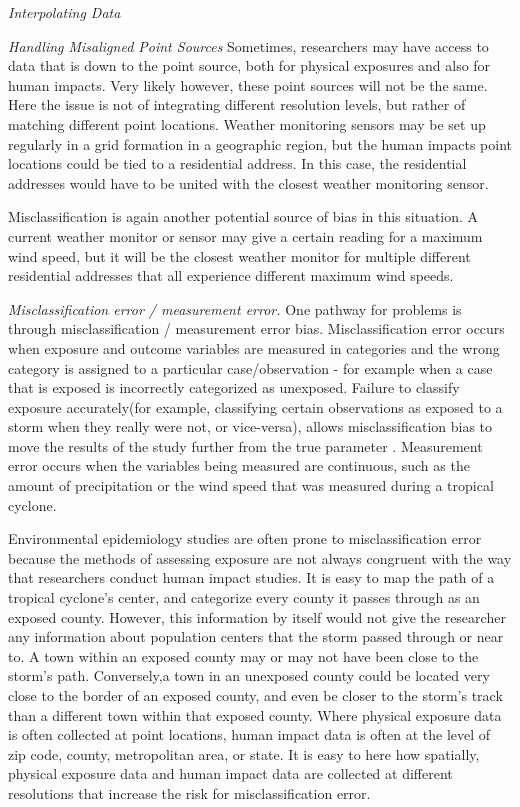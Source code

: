 \documentclass[]{article}
\begin{document}
\emph{Interpolating Data}

\emph{Handling Misaligned Point Sources} Sometimes, researchers may have
access to data that is down to the point source, both for physical
exposures and also for human impacts. Very likely however, these point
sources will not be the same. Here the issue is not of integrating
different resolution levels, but rather of matching different point
locations. Weather monitoring sensors may be set up regularly in a grid
formation in a geographic region, but the human impacts point locations
could be tied to a residential address. In this case, the residential
addresses would have to be united with the closest weather monitoring
sensor.

Misclassification is again another potential source of bias in this
situation. A current weather monitor or sensor may give a certain
reading for a maximum wind speed, but it will be the closest weather
monitor for multiple different residential addresses that all experience
different maximum wind speeds.

\emph{Misclassification error / measurement error.} One pathway for
problems is through misclassification / measurement error bias.
Misclassification error occurs when exposure and outcome variables are
measured in categories and the wrong category is assigned to a
particular case/observation - for example when a case that is exposed is
incorrectly categorized as unexposed. Failure to classify exposure
accurately(for example, classifying certain observations as exposed to a
storm when they really were not, or vice-versa), allows
misclassification bias to move the results of the study further from the
true parameter . Measurement error occurs when the variables being
measured are continuous, such as the amount of precipitation or the wind
speed that was measured during a tropical cyclone.

Environmental epidemiology studies are often prone to misclassification
error because the methods of assessing exposure are not always congruent
with the way that researchers conduct human impact studies. It is easy
to map the path of a tropical cyclone's center, and categorize every
county it passes through as an exposed county. However, this information
by itself would not give the researcher any information about population
centers that the storm passed through or near to. A town within an
exposed county may or may not have been close to the storm's path.
Conversely,a town in an unexposed county could be located very close to
the border of an exposed county, and even be closer to the storm's track
than a different town within that exposed county. Where physical
exposure data is often collected at point locations, human impact data
is often at the level of zip code, county, metropolitan area, or state.
It is easy to here how spatially, physical exposure data and human
impact data are collected at different resolutions that increase the
risk for misclassification error.
\end{document}
